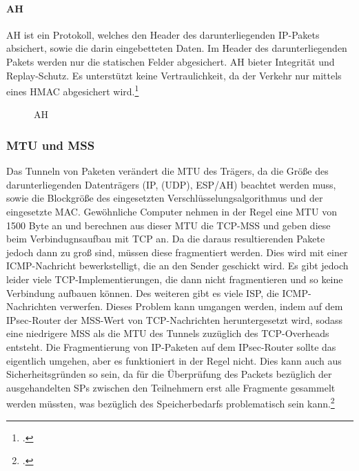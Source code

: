 \paragraph{AH}
\ac{AH} ist ein Protokoll, welches den Header des darunterliegenden \ac{IP}-Pakets absichert,
sowie die darin eingebetteten Daten. Im Header des darunterliegenden Pakets werden nur die statischen Felder
abgesichert. \ac{AH} bieter Integrität und Replay-Schutz. Es unterstützt keine Vertraulichkeit, da
der Verkehr nur mittels eines \ac{HMAC} abgesichert wird.\footcite[][]{stephen_kent_rfc_2005-1}
\begin{figure}[h!]
    \label{fig:AH}
    \centering
    \def\svgwidth{\columnwidth}
    
    \caption{\ac{AH}}
\end{figure}

\subsubsection{MTU und MSS}

Das Tunneln von Paketen verändert die \ac{MTU} des Trägers, da die Größe des darunterliegenden
Datenträgers (IP, (UDP), ESP/AH) beachtet werden muss, sowie die Blockgröße
des eingesetzten Verschlüsselungsalgorithmus und der eingesetzte \ac{MAC}.
Gewöhnliche Computer nehmen in der Regel eine \ac{MTU} von 1500 Byte an und 
berechnen aus dieser \ac{MTU} die TCP-\ac{MSS} und geben diese beim Verbindugnsaufbau mit \ac{TCP}
an. Da die daraus resultierenden Pakete jedoch dann zu groß sind, müssen diese fragmentiert werden.
Dies wird mit einer \ac{ICMP}-Nachricht bewerkstelligt, die an den Sender geschickt wird.
Es gibt jedoch leider viele \ac{TCP}-Implementierungen, die dann nicht fragmentieren und so
keine Verbindung aufbauen können. Des weiteren gibt es viele \ac{ISP}, die ICMP-Nachrichten
verwerfen. Dieses Problem kann umgangen werden, indem auf dem \ac{IPsec}-Router
der \ac{MSS}-Wert von \ac{TCP}-Nachrichten heruntergesetzt wird, sodass eine niedrigere
\ac{MSS} als die \ac{MTU} des Tunnels zuzüglich des \ac{TCP}-Overheads entsteht.
Die Fragmentierung von \ac{IP}-Paketen auf dem \ac{IPsec}-Router sollte das eigentlich umgehen,
aber es funktioniert in der Regel nicht. Dies kann auch aus Sicherheitsgründen so sein,
da für die Überprüfung des Packets bezüglich der ausgehandelten \acp{SP} zwischen den Teilnehmern
erst alle Fragmente gesammelt werden müssten, was bezüglich des Speicherbedarfs problematisch sein kann.\footcite[][Kapitel 3.4 Inbound Packet Processing]{stephen_kent_rfc_2005-2}

